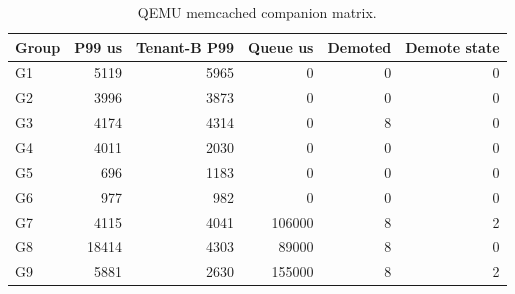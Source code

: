 
\begin{table}[t]
\centering
\scriptsize
\caption{QEMU memcached companion matrix.}
\begin{tabular}{lrrrrr}
\toprule
Group & P99 us & Tenant-B P99 & Queue us & Demoted & Demote state \\
\midrule
G1 & 5119 & 5965 & 0 & 0 & 0 \\
G2 & 3996 & 3873 & 0 & 0 & 0 \\
G3 & 4174 & 4314 & 0 & 8 & 0 \\
G4 & 4011 & 2030 & 0 & 0 & 0 \\
G5 & 696 & 1183 & 0 & 0 & 0 \\
G6 & 977 & 982 & 0 & 0 & 0 \\
G7 & 4115 & 4041 & 106000 & 8 & 2 \\
G8 & 18414 & 4303 & 89000 & 8 & 0 \\
G9 & 5881 & 2630 & 155000 & 8 & 2 \\
\bottomrule
\end{tabular}
\end{table}
